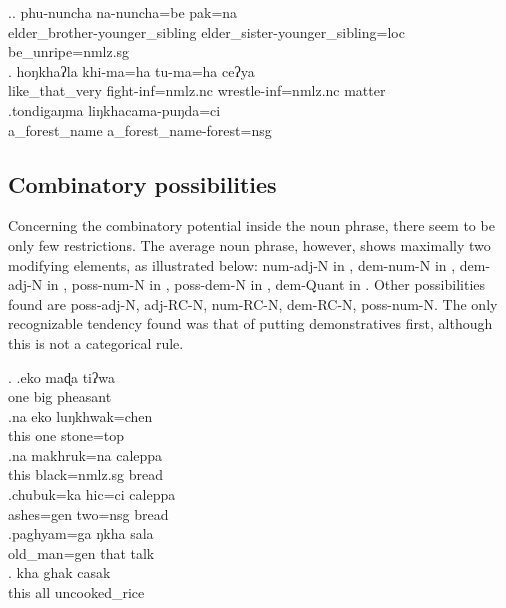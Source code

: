 \ex.\ag. phu-nuncha    na-nuncha=be     pak=na\\
elder\_brother-younger\_sibling elder\_sister-younger\_sibling{\sc =loc} be\_unripe{\sc =nmlz.sg}\\
 
\bg. hoŋkhaʔla khi-ma=ha     tu-ma=ha     ceʔya \\
like\_that\_very fight{\sc -inf=nmlz.nc} wrestle{\sc -inf=nmlz.nc} matter\\
 
 \bg.tondigaŋma liŋkhacama-puŋda=ci\\
  a\_forest\_name a\_forest\_name-forest{\sc =nsg}\\
   
 
\subsection{Combinatory possibilities}

Concerning the combinatory potential inside the noun phrase, there seem to be only few restrictions. The average noun phrase, however, shows maximally two modi\-fying elements, as illustrated below: {\sc num-adj-N} in \Next[a], {\sc dem-num-N} in \Next[b], {\sc dem-adj-N} in \Next[c], {\sc poss-num-N} in \Next[d], {\sc poss-dem-N} in \Next[e], {\sc dem-Quant } in \Next[f]. Other possibilities found are {\sc poss-adj-N}, {\sc adj-RC-N}, {\sc num-RC-N}, {\sc dem-RC-N}, {\sc poss-num-N}. The only recognizable tendency found was that of putting demonstratives first, although this is not a categorical rule.
 	
 \ex. \ag.eko maɖa tiʔwa\\
 one big pheasant\\
  
 \bg.na   eko luŋkhwak=chen\\
 this one stone{\sc =top}\\
  
  \bg.na   makhruk=na caleppa \\
this black{\sc =nmlz.sg} bread\\
  
  \bg.chubuk=ka    hic=ci     caleppa\\
 ashes{\sc =gen} two{\sc =nsg} bread\\
  
  \bg.paghyam=ga    ŋkha sala\\
 old\_man{\sc =gen} that talk\\
  
 \bg.      kha  ghak casak\\
 this  all uncooked\_rice\\
 
